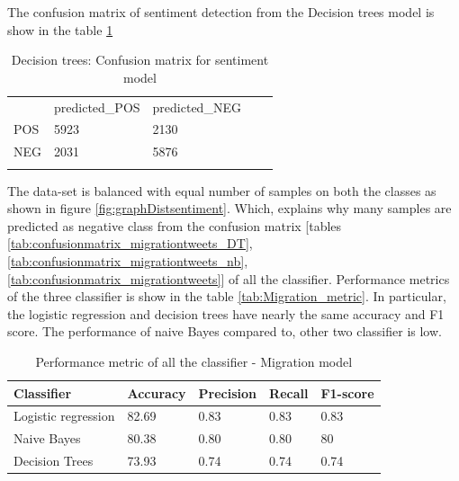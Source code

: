 \begin{itemize}
    The confusion matrix of sentiment detection from the Decision trees model is show in the table \ref{tab:confusionmatrix_sentimenttweets_DT}
    
    \begin{table}[]
\centering
\begin{tabular}{lllll}
\cline{1-3}
\multicolumn{1}{|l|}{}   & \multicolumn{1}{l|}{predicted\_POS} & \multicolumn{1}{l|}{predicted\_NEG}  &  &  \\ \cline{1-3}
\multicolumn{1}{|l|}{POS} & \multicolumn{1}{l|}{5923}  & \multicolumn{1}{l|}{2130} &  &  \\ \cline{1-3}
\multicolumn{1}{|l|}{NEG}   & \multicolumn{1}{l|}{2031}  & \multicolumn{1}{l|}{5876}  &  &  \\ \cline{1-3}
                            &                           &                           &  & 
\end{tabular}
\caption{Decision trees: Confusion matrix for sentiment model}
\label{tab:confusionmatrix_sentimenttweets_DT}
\end{table}
     
\end{itemize}


 The data-set is balanced with equal number of samples on both the classes as shown in figure \ref{fig:graphDistsentiment}. Which, explains why many samples are predicted as negative class from the confusion matrix [tables \ref{tab:confusionmatrix_migrationtweets_DT}, \ref{tab:confusionmatrix_migrationtweets_nb}, \ref{tab:confusionmatrix_migrationtweets}]  of all the classifier. Performance metrics of the three classifier is show in the table \ref{tab:Migration_metric}. In particular, the logistic regression and decision trees have nearly the same accuracy and F1 score. The performance of naive Bayes compared to, other two classifier is low.

\begin{table}[]
\centering
\begin{tabular}{lllll}
\hline
\textbf{Classifier} & \textbf{Accuracy} & \textbf{Precision} & \textbf{Recall} & \textbf{F1-score} \\ \hline
Logistic regression & 82.69             & 0.83              & 0.83           & 0.83             \\ \hline
Naive Bayes         & 80.38             & 0.80              & 0.80           & 80             \\ \hline
Decision Trees     & 73.93             &  0.74              &  0.74           &  0.74             \\ \hline
\end{tabular}
\caption{Performance metric of all the classifier - Migration model}
\label{tab:sentiment_metric}
\end{table}




